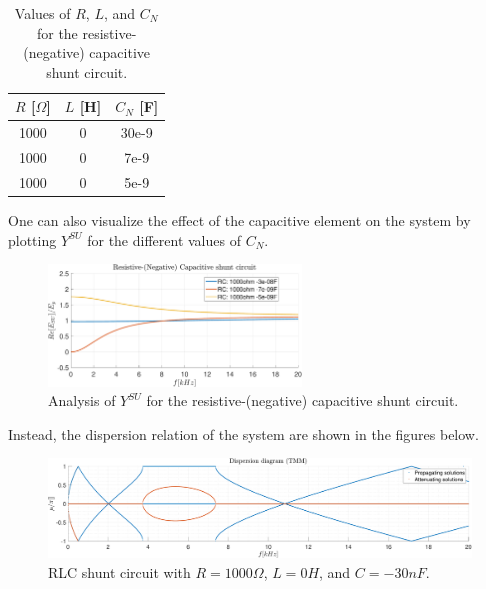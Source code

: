 \begin{table}[H]
    \centering
    \begin{tabular}{|c|c|c|}
        \hline
        $R$ [$\Omega$] & $L$ [H] & $C_N$ [F] \\
        \hline
        1000           & 0       & 30e-9     \\
        1000           & 0       & 7e-9      \\
        1000           & 0       & 5e-9      \\
        \hline
    \end{tabular}
    \caption{Values of $R$, $L$, and $C_N$ for the resistive-(negative) capacitive shunt circuit.}
    \label{tab:RLC_N_values_RC_case}
\end{table}

One can also visualize the effect of the capacitive element on the system by plotting $Y^{SU}$ for the different values of $C_N$.

\begin{figure}[H]
    \centering
    \includegraphics[width=0.6\textwidth]{./img/MATLAB/Y_SU_Resistive-(Negative) Capacitive shunt circuit.pdf}
    \caption{Analysis of $Y^{SU}$ for the resistive-(negative) capacitive shunt circuit.}
    \label{fig:Y_SU_Resistive-(Negative)_Capacitive_shunt_circuit.pdf}
\end{figure}

Instead, the dispersion relation of the system are shown in the figures below.

\begin{figure}[H]
    \centering
    \includegraphics[width=\textwidth]{./img/MATLAB/TMM_ON-ON-ON_RLC_R1000_L0_C-3e-08.pdf}
    \caption{RLC shunt circuit with $R = 1000 \Omega$, $L = 0 H$, and $C = -30 nF$.}
    \label{fig:TMM_ON-ON-ON_RLC_R1000_L0_C-30e-09.pdf}
\end{figure}

